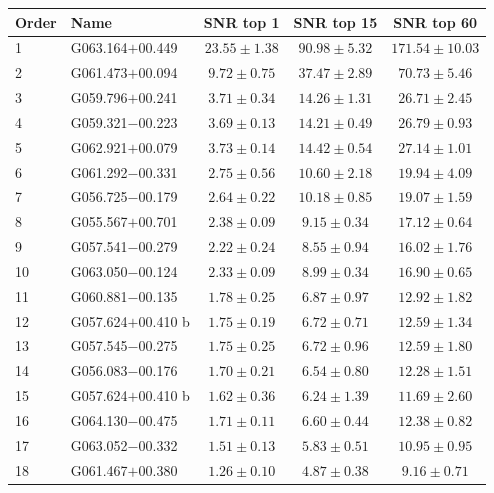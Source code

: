 \begin{table}[H]
    \centering
    \small
    \begin{tabular}{l l c c c}
        \toprule
        Order & Name & SNR top 1 & SNR top 15 & SNR top 60 \\
        \midrule
        1 & G063.164$+$00.449 & $23.55 \pm 1.38$ & $90.98 \pm 5.32$ & $171.54 \pm 10.03$ \\
        2 & G061.473$+$00.094 & $9.72 \pm 0.75$ & $37.47 \pm 2.89$ & $70.73 \pm 5.46$ \\
        3 & G059.796$+$00.241 & $3.71 \pm 0.34$ & $14.26 \pm 1.31$ & $26.71 \pm 2.45$ \\
        4 & G059.321$-$00.223 & $3.69 \pm 0.13$ & $14.21 \pm 0.49$ & $26.79 \pm 0.93$ \\
        5 & G062.921$+$00.079 & $3.73 \pm 0.14$ & $14.42 \pm 0.54$ & $27.14 \pm 1.01$ \\
        6 & G061.292$-$00.331 & $2.75 \pm 0.56$ & $10.60 \pm 2.18$ & $19.94 \pm 4.09$ \\
        7 & G056.725$-$00.179 & $2.64 \pm 0.22$ & $10.18 \pm 0.85$ & $19.07 \pm 1.59$ \\
        8 & G055.567$+$00.701 & $2.38 \pm 0.09$ & $9.15 \pm 0.34$ & $17.12 \pm 0.64$ \\
        9 & G057.541$-$00.279 & $2.22 \pm 0.24$ & $8.55 \pm 0.94$ & $16.02 \pm 1.76$ \\
        10 & G063.050$-$00.124 & $2.33 \pm 0.09$ & $8.99 \pm 0.34$ & $16.90 \pm 0.65$ \\
        11 & G060.881$-$00.135 & $1.78 \pm 0.25$ & $6.87 \pm 0.97$ & $12.92 \pm 1.82$ \\
        12 & G057.624$+$00.410 b & $1.75 \pm 0.19$ & $6.72 \pm 0.71$ & $12.59 \pm 1.34$ \\
        13 & G057.545$-$00.275 & $1.75 \pm 0.25$ & $6.72 \pm 0.96$ & $12.59 \pm 1.80$ \\
        14 & G056.083$-$00.176 & $1.70 \pm 0.21$ & $6.54 \pm 0.80$ & $12.28 \pm 1.51$ \\
        15 & G057.624$+$00.410 b & $1.62 \pm 0.36$ & $6.24 \pm 1.39$ & $11.69 \pm 2.60$ \\
        16 & G064.130$-$00.475 & $1.71 \pm 0.11$ & $6.60 \pm 0.44$ & $12.38 \pm 0.82$ \\
        17 & G063.052$-$00.332 & $1.51 \pm 0.13$ & $5.83 \pm 0.51$ & $10.95 \pm 0.95$ \\
        18 & G061.467$+$00.380 & $1.26 \pm 0.10$ & $4.87 \pm 0.38$ & $9.16 \pm 0.71$ \\

\end{tabular}
\end{table}
